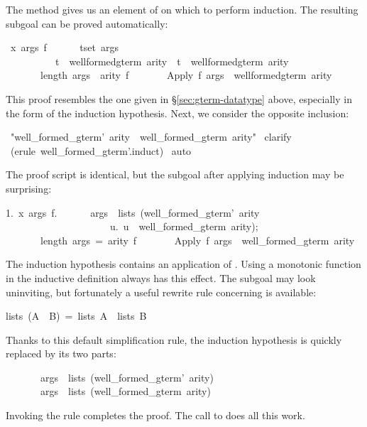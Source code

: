 The  method gives
us an element of  on which to perform 
induction.  The resulting subgoal can be proved automatically:
\begin{isabelle}
{}{\isachardot}\ {\isasymAnd}x\ args\ f{\isachardot}\isanewline
\ \ \ \ \ \ {\isasymlbrakk}{\isasymforall}t{\isasymin}set\ args{\isachardot}\isanewline
\ \ \ \ \ \ \ \ \ \ t\ {\isasymin}\ well{\isacharunderscore}formed{\isacharunderscore}gterm\ arity\ {\isasymand}\ t\ {\isasymin}\ well{\isacharunderscore}formed{\isacharunderscore}gterm{\isacharprime}\ arity{\isacharsemicolon}\isanewline
\ \ \ \ \ \ \ length\ args\ {\isacharequal}\ arity\ f{\isasymrbrakk}\isanewline
\ \ \ \ \ \ {\isasymLongrightarrow}\ Apply\ f\ args\ {\isasymin}\ well{\isacharunderscore}formed{\isacharunderscore}gterm{\isacharprime}\ arity%
\end{isabelle}
%
This proof resembles the one given in
{\S}\ref{sec:gterm-datatype} above, especially in the form of the
induction hypothesis.  Next, we consider the opposite inclusion:
\begin{isabelle}
\ "well_formed_gterm'\ arity\ \isasymsubseteq \ well_formed_gterm\ arity"\isanewline
{}\ clarify\isanewline
{}\ (erule\ well_formed_gterm'.induct)\isanewline
{}\ auto\isanewline
{}
\end{isabelle}
%
The proof script is identical, but the subgoal after applying induction may
be surprising:
\begin{isabelle}
1.\ \isasymAnd x\ args\ f.\isanewline
\ \ \ \ \ \ \isasymlbrakk args\ \isasymin \ lists\ (well_formed_gterm'\ arity\ \isasyminter\isanewline
\ \ \ \ \ \ \ \ \ \ \ \ \ \ \ \ \ \ \ \ \ \isacharbraceleft u.\ u\ \isasymin \ well_formed_gterm\ arity\isacharbraceright );\isanewline
\ \ \ \ \ \ \ length\ args\ =\ arity\ f\isasymrbrakk \isanewline
\ \ \ \ \ \ \isasymLongrightarrow \ Apply\ f\ args\ \isasymin \ well_formed_gterm\ arity%
\end{isabelle}
The induction hypothesis contains an application of .  Using a
monotonic function in the inductive definition always has this effect.  The
subgoal may look uninviting, but fortunately a useful rewrite rule concerning
 is available:
\begin{isabelle}
lists\ (A\ \isasyminter \ B)\ =\ lists\ A\ \isasyminter \ lists\ B
\end{isabelle}
%
Thanks to this default simplification rule, the induction hypothesis 
is quickly replaced by its two parts:
\begin{isabelle}
\ \ \ \ \ \ \ args\ \isasymin \ lists\ (well_formed_gterm'\ arity)\isanewline
\ \ \ \ \ \ \ args\ \isasymin \ lists\ (well_formed_gterm\ arity)
\end{isabelle}
Invoking the rule  completes the proof.  The
call to
 does all this work.

